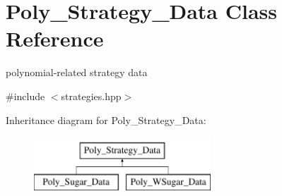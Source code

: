 \hypertarget{class_poly___strategy___data}{}\section{Poly\+\_\+\+Strategy\+\_\+\+Data Class Reference}
\label{class_poly___strategy___data}


polynomial-\/related strategy data  




{\ttfamily \#include $<$strategies.\+hpp$>$}

Inheritance diagram for Poly\+\_\+\+Strategy\+\_\+\+Data\+:\begin{figure}[H]
\begin{center}
\leavevmode
\includegraphics[height=2.000000cm]{class_poly___strategy___data}
\end{center}
\end{figure}
